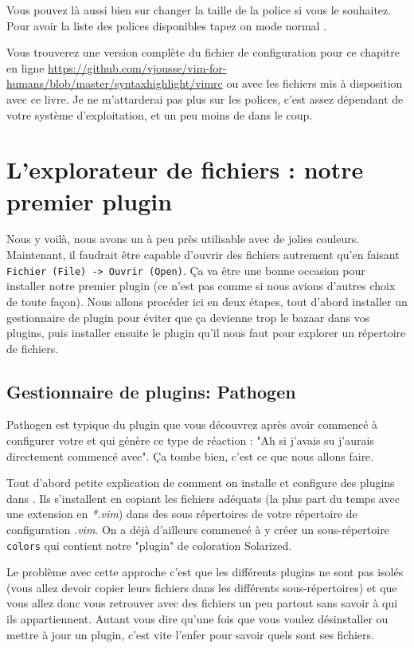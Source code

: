 Vous pouvez là aussi bien sur changer la taille de la police si vous le souhaitez. Pour avoir la liste des polices disponibles tapez on mode normal .

Vous trouverez une version complète du fichier de configuration pour ce chapitre en ligne \url{https://github.com/vjousse/vim-for-humans/blob/master/syntaxhighlight/vimrc} ou avec les fichiers mis à disposition avec ce livre. Je ne m'attarderai pas plus sur les polices, c'est assez dépendant de votre système d'exploitation, et un peu moins de \vim dans le coup.


\section{L'explorateur de fichiers : notre premier plugin}

Nous y voilà, nous avons un \vim à peu près utilisable avec de jolies couleurs. Maintenant, il faudrait être capable d'ouvrir des fichiers autrement qu'en faisant \Verb|Fichier (File) -> Ouvrir (Open)|. Ça va être une bonne occasion pour installer notre premier plugin (ce n'est pas comme si nous avions d'autres choix de toute façon). Nous allons procéder ici en deux étapes, tout d'abord installer un gestionnaire de plugin pour éviter que ça devienne trop le bazaar dans vos plugins, puis installer ensuite le plugin qu'il nous faut pour explorer un répertoire de fichiers.

\subsection{Gestionnaire de plugins: Pathogen}

Pathogen est typique du plugin que vous découvrez après avoir commencé à configurer votre \vim et qui génère ce type de réaction : "Ah si j'avais su j'aurais directement commencé avec". Ça tombe bien, c'est ce que nous allons faire.

Tout d'abord petite explication de comment on installe et configure des plugins dans \vim. Ils s'installent en copiant les fichiers adéquats (la plus part du temps avec une extension en \emph{*.vim}) dans des sous répertoires de votre répertoire de configuration \emph{.vim}. On a déjà d'ailleurs commencé à y créer un sous-répertoire \Verb|colors| qui contient notre "plugin" de coloration Solarized.

Le problème avec cette approche c'est que les différents plugins ne sont pas isolés (vous allez devoir copier leurs fichiers dans les différents sous-répertoires) et que vous allez donc vous retrouver avec des fichiers un peu partout sans savoir à qui ils appartiennent. Autant vous dire qu'une fois que vous voulez désinstaller ou mettre à jour un plugin, c'est vite l'enfer pour savoir quels sont ses fichiers.

